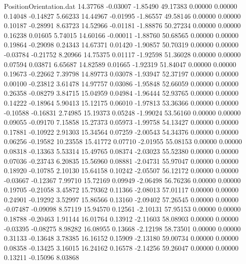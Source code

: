 \begin{filecontents}{PositionOrientation.dat}
  14.37768   -0.03007   -1.85490    49.17383    0.00000    0.00000    0.14048   -0.14827    5.66233
  14.44967   -0.01995   -1.86557    49.58146    0.00000    0.00000    0.10187   -0.28991    8.63723
  14.52966   -0.01181   -1.88876    50.27234    0.00000    0.00000    0.16238    0.01605    5.74015
  14.60166   -0.00011   -1.88760    50.68565    0.00000    0.00000    0.19864   -0.29098    0.24343
  14.67371    0.01420   -1.90857    50.70319    0.00000    0.00000   -0.03784   -0.21752    8.20966
  14.75375    0.01117   -1.92598    51.36028    0.00000    0.00000    0.07594    0.03871    6.65687
  14.82589    0.01665   -1.92319    51.84047    0.00000    0.00000    0.19673   -0.22662    7.39798
  14.89773    0.03078   -1.93947    52.37197    0.00000    0.00000    0.00100   -0.23812    3.61478
  14.97757    0.03086   -1.95848    52.66059    0.00000    0.00000    0.26358   -0.08279    3.84715
  15.04959    0.04984   -1.96444    52.93765    0.00000    0.00000    0.14222   -0.18964    5.90413
  15.12175    0.06010   -1.97813    53.36366    0.00000    0.00000   -0.10588   -0.16831    2.74985
  15.19373    0.05248   -1.99024    53.56160    0.00000    0.00000    0.09055   -0.09170    7.15858
  15.27373    0.05973   -1.99758    54.13427    0.00000    0.00000    0.17881   -0.10922    2.91303
  15.34564    0.07259   -2.00543    54.34376    0.00000    0.00000    0.06256   -0.19582   10.23558
  15.41772    0.07710   -2.01955    55.08153    0.00000    0.00000    0.08318   -0.13363    5.53314
  15.49765    0.08374   -2.03023    55.52380    0.00000    0.00000    0.07036   -0.23743    6.20835
  15.56960    0.08881   -2.04731    55.97047    0.00000    0.00000    0.18920   -0.10785    2.10130
  15.64158    0.10242   -2.05507    56.12172    0.00000    0.00000   -0.03667   -0.12367    7.99710
  15.72169    0.09949   -2.06498    56.76236    0.00000    0.00000    0.19705   -0.21058    3.45872
  15.79362    0.11366   -2.08013    57.01117    0.00000    0.00000    0.24901   -0.19292    3.52997
  15.86566    0.13160   -2.09402    57.26545    0.00000    0.00000   -0.07487   -0.09098    8.57119
  15.94570    0.12561   -2.10131    57.95153    0.00000    0.00000    0.18788   -0.20463    1.91144
  16.01764    0.13912   -2.11603    58.08903    0.00000    0.00000   -0.03395   -0.08275    8.98282
  16.08955    0.13668   -2.12198    58.73501    0.00000    0.00000    0.31133   -0.13648    3.78385
  16.16152    0.15909   -2.13180    59.00734    0.00000    0.00000    0.08358   -0.13425    3.16015
  16.24162    0.16578   -2.14256    59.26047    0.00000    0.00000    0.13211   -0.15096    8.03868

\end{filecontents}
